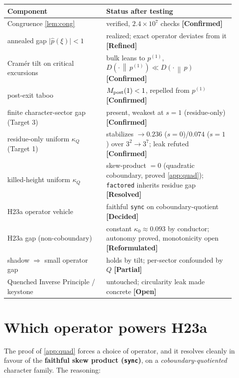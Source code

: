 \documentclass[11pt]{article}
\newcommand{\KL}[2]{D\!\left(#1\,\middle\|\,#2\right)}
\newcommand{\epi}[1]{{\small\sffamily\textbf{[#1]}}}
\theoremstyle{plain}
\theoremstyle{remark}
\begin{document}
\begin{center}
\renewcommand{\arraystretch}{1.3}
\begin{tabular}{@{}p{0.40\linewidth} p{0.52\linewidth}@{}}
\toprule
\textbf{Component} & \textbf{Status after testing}\\
\midrule
Congruence \cref{lem:cong} & verified, $2.4\times10^7$ checks \epi{Confirmed}\\
annealed gap $\lvert\hat p(\xi)\rvert<1$ & realized; exact operator deviates from it \epi{Refined}\\
Cram\'er tilt on critical excursions & bulk leans to $p^{(1)}$, $\KL{\cdot}{p^{(1)}}\ll\KL{\cdot}{p}$ \epi{Confirmed}\\
post-exit taboo & $M_{\rm post}(1)<1$, repelled from $p^{(1)}$ \epi{Confirmed}\\
finite character-sector gap (Target 3) & present, weakest at $s=1$ (residue-only) \epi{Confirmed}\\
residue-only uniform $\kappa_Q$ (Target 1) & stabilizes $\to0.236$ ($s{=}0$)/$0.074$ ($s{=}1$) over $3^2\!\to\!3^7$; leak refuted \epi{Confirmed}\\
killed-height uniform $\kappa_Q$ & skew-product $=0$ (quadratic coboundary, proved \cref{app:quad}); \texttt{factored} inherits residue gap \epi{Resolved}\\
H23a operator vehicle & faithful \texttt{sync} on coboundary-quotient \epi{Decided}\\
H23a gap (non-coboundary) & constant $\kappa_0\approx0.093$ by conductor; autonomy proved, monotonicity open \epi{Reformulated}\\
shadow $\Rightarrow$ small operator gap & holds by tilt; per-sector confounded by $Q$ \epi{Partial}\\
Quenched Inverse Principle / keystone & untouched; circularity leak made concrete \epi{Open}\\
\bottomrule
\end{tabular}
\end{center}

\section*{Which operator powers H23a}

The proof of \cref{app:quad} forces a choice of operator, and it resolves
cleanly in favour of the \textbf{faithful skew product (\texttt{sync})}, on a
\emph{coboundary-quotiented} character family. The reasoning:
\end{document}
